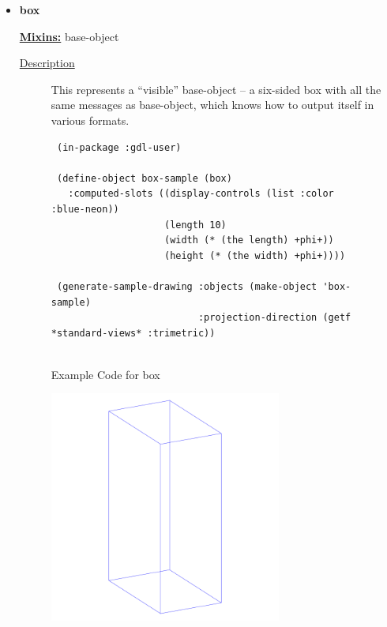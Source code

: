 \documentclass [11pt]{book}
\begin{document}
\begin{itemize}
\item {}
\label{prim:box}
\textbf{box}


\textbf{
\underline{Mixins:}} base-object





\begin{description}

\item [
\underline{Description}]


This represents a ``visible'' base-object -- a six-sided box with all the same
messages as base-object, which knows how to output itself in various formats.



\end{description}




\begin{figure}
\begin{lrbox}{\boxedverb}
\begin{minipage}{\linewidth}
{\small

\begin{verbatim}
 (in-package :gdl-user)

 (define-object box-sample (box)
   :computed-slots ((display-controls (list :color :blue-neon))
                    (length 10)
                    (width (* (the length) +phi+))
                    (height (* (the width) +phi+))))

 (generate-sample-drawing :objects (make-object 'box-sample)
                          :projection-direction (getf *standard-views* :trimetric))


\end{verbatim}}
\end{minipage}
\end{lrbox}
\fbox{\usebox{\boxedverb}}

\caption{Example Code for box}

\label{fig:example-code-box}

\end{figure}

\begin{figure}
\begin{center}
\includegraphics[width=3in,height=3in]{../images/example-box.pdf}
\end{center}


\end{figure}
\end{itemize}
\end{document}
